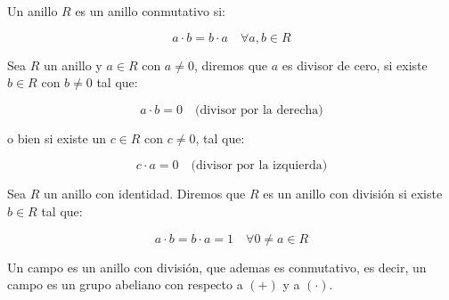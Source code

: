     \begin{definicion}
        Un anillo $R$ es un anillo conmutativo si:

        \begin{equation}
            a \cdot b = b \cdot a \quad \forall a, b \in R
        \end{equation}
    \end{definicion}

    \begin{definicion}
        Sea $R$ un anillo y $a \in R$ con $a \ne 0$, diremos que $a$ es divisor de cero, si existe $b \in R$ con $b \ne 0$ tal que:

        \begin{equation}
            a \cdot b = 0 \quad \text{(divisor por la derecha)}
        \end{equation}

        o bien si existe un $c \in R$ con $c \ne 0$, tal que:

        \begin{equation}
            c \cdot a = 0 \quad \text{(divisor por la izquierda)}
        \end{equation}
    \end{definicion}

    \begin{definicion}
        Sea $R$ un anillo con identidad. Diremos que $R$ es un anillo con división si existe $b \in R$ tal que:

        \begin{equation}
            a \cdot b = b \cdot a = 1 \quad \forall 0 \ne a \in R
        \end{equation}
    \end{definicion}

    \begin{definicion}
        Un campo es un anillo con división, que ademas es conmutativo, es decir, un campo es un grupo abeliano con respecto a $(+)$ y a $(\cdot)$.
    \end{definicion}
